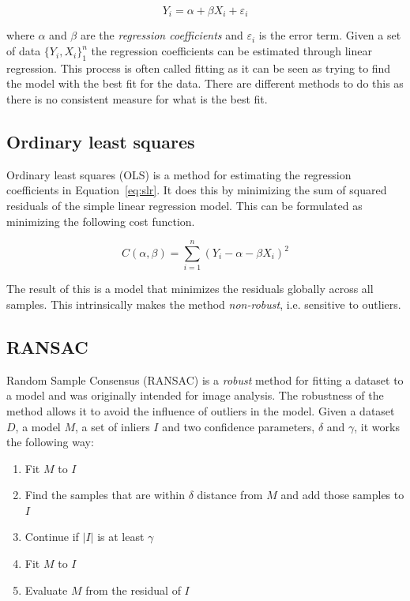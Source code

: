 \documentclass[a4paper]{report}
\begin{document}
\begin{equation}
    Y_i = \alpha + \beta X_i + \varepsilon_i
    \label{eq:slr}
\end{equation}

where $\alpha$ and $\beta$ are the \emph{regression coefficients} and
$\varepsilon_i$ is the error term. Given a set of data
$\displaystyle \{Y_i, X_i\}_1^n$ the regression coefficients can be estimated
through linear regression. This process is often called fitting as it can be
seen as trying to find the model with the best fit for the data. There are
different methods to do this as there is no consistent measure for what is the
best fit.

\subsection{Ordinary least squares}
Ordinary least squares (OLS) is a method for estimating the regression
coefficients in Equation~\ref{eq:slr}. It does this by minimizing the sum of
squared residuals of the simple linear regression model. This can be formulated
as minimizing the following cost function.

\begin{equation}
    C(\alpha, \beta) = \sum_{i=1}^n(Y_i - \alpha - \beta X_i)^2
\end{equation}

The result of this is a model that minimizes the residuals globally across all
samples. This intrinsically makes the method \emph{non-robust}, i.e. sensitive
to outliers.

\subsection{RANSAC}
\label{sec:ransac}

Random Sample Consensus (RANSAC) \citep{fischler81} is a \emph{robust} method
for fitting a dataset to a model and was originally intended for image
analysis. The robustness of the method allows it to avoid the influence of
outliers in the model. Given a dataset $D$, a model $M$, a set of inliers $I$
and two confidence parameters, $\delta$ and $\gamma$, it works the following
way:

\begin{enumerate}
    \item Fit $M$ to $I$
    \item Find the samples that are within $\delta$ distance from $M$ and add
        those samples to $I$
    \item Continue if $|I|$ is at least $\gamma$
    \item Fit $M$ to $I$
    \item Evaluate $M$ from the residual of $I$
\end{enumerate}
\end{document}
